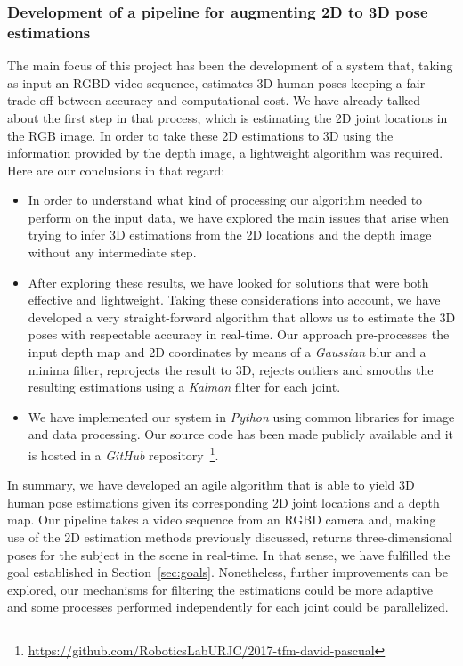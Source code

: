 \subsubsection{Development of a pipeline for augmenting 2D to 3D pose estimations}
The main focus of this project has been the development of a system that, taking as input an RGBD video sequence, estimates 3D human poses keeping a fair trade-off between accuracy and computational cost. We have already talked about the first step in that process, which is estimating the 2D joint locations in the RGB image. In order to take these 2D estimations to 3D using the information provided by the depth image, a lightweight algorithm was required. Here are our conclusions in that regard:

\begin{itemize}
    \item In order to understand what kind of processing our algorithm needed to perform on the input data, we have explored the main issues that arise when trying to infer 3D estimations from the 2D locations and the depth image without any intermediate step.
    \item After exploring these results, we have looked for solutions that were both effective and lightweight. Taking these considerations into account, we have developed a very straight-forward algorithm that allows us to estimate the 3D poses with respectable accuracy in real-time. Our approach pre-processes the input depth map and 2D coordinates by means of a \emph{Gaussian} blur and a minima filter, reprojects the result to 3D, rejects outliers and smooths the resulting estimations using a \emph{Kalman} filter for each joint.
    \item We have implemented our system in \emph{Python} using common libraries for image and data processing. Our source code has been made publicly available and it is hosted in a \emph{GitHub} repository~\footnote{\url{https://github.com/RoboticsLabURJC/2017-tfm-david-pascual}}.
\end{itemize}

In summary, we have developed an agile algorithm that is able to yield 3D human pose estimations given its corresponding 2D joint locations and a depth map. Our pipeline takes a video sequence from an RGBD camera and, making use of the 2D estimation methods previously discussed, returns three-dimensional poses for the subject in the scene in real-time. In that sense, we have fulfilled the goal established in Section~\ref{sec:goals}. Nonetheless, further improvements can be explored, \eg our mechanisms for filtering the estimations could be more adaptive and some processes performed independently for each joint could be parallelized.

